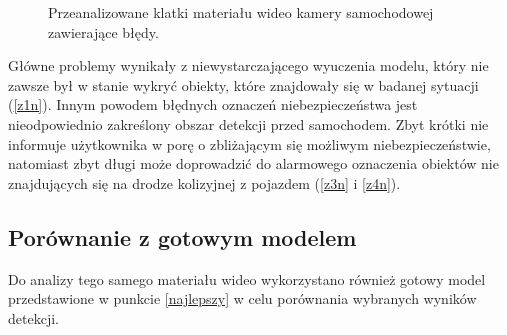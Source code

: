 \begin{figure}[H]\ContinuedFloat
\centering
{}\hfill
\caption{Przeanalizowane klatki materiału wideo kamery samochodowej zawierające błędy.}
\label{fig:zdj_niepop}
\end{figure}

\hspace{0.5cm}
Główne problemy wynikały z niewystarczającego wyuczenia modelu, który nie zawsze był w stanie wykryć obiekty, które znajdowały się w badanej sytuacji (\ref{z1n}). Innym powodem błędnych oznaczeń niebezpieczeństwa jest nieodpowiednio zakreślony obszar detekcji przed samochodem. Zbyt krótki nie informuje użytkownika w porę o zbliżającym się możliwym niebezpieczeństwie, natomiast zbyt długi może doprowadzić do alarmowego oznaczenia obiektów nie znajdujących się na drodze kolizyjnej z pojazdem (\ref{z3n} i \ref{z4n}).

\subsection{Porównanie z gotowym modelem}

\hspace{0.5cm}
Do analizy tego samego materiału wideo wykorzystano również gotowy model przedstawione w punkcie \ref{najlepszy} w celu porównania wybranych wyników detekcji.

